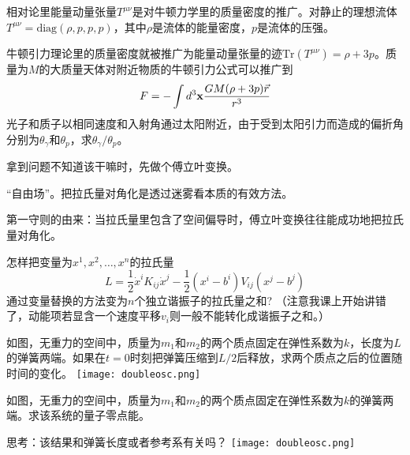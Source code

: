 \documentclass[CJK]{beamer}
\begin{document}
\begin{frame}
\bch
相对论里能量动量张量$T^{\mu\nu}$是对牛顿力学里的质量密度的推广。对静止的理想流体$T^{\mu\nu} = \mathrm{diag}(\rho, p, p, p)$，其中$\rho$是流体的能量密度，$p$是流体的压强。

牛顿引力理论里的质量密度就被推广为能量动量张量的迹$\mathrm{Tr}(T^{\mu\nu}) = \rho + 3p$。质量为$M$的大质量天体对附近物质的牛顿引力公式可以推广到
$$ F = - \int d^3{\mathbf{x}} \frac{GM(\rho + 3p) \vec{r}}{r^3}$$
光子和质子以相同速度和入射角通过太阳附近，由于受到太阳引力而造成的偏折角分别为$\theta_\gamma$和$\theta_p$，求$\theta_\gamma/\theta_p$。

\ech
\end{frame}

\begin{frame}
\bch
拿到问题不知道该干嘛时，先做个傅立叶变换。
\ech
\end{frame}

\begin{frame}
\bch

{“自由场”。把拉氏量对角化是透过迷雾看本质的有效方法。

\skipline
 第一守则的由来：当拉氏量里包含了空间偏导时，傅立叶变换往往能成功地把拉氏量对角化。}

\ech
\end{frame}

\begin{frame}
\bch
怎样把变量为$x^1, x^2,\ldots, x^n$的拉氏量
$$L = \frac{1}{2} \dot{x}^i K_{ij}\dot{x}^j - \frac{1}{2} (x^i-b^i) V_{ij} (x^j - b^j)$$
通过变量替换的方法变为$n$个独立谐振子的拉氏量之和? （注意我课上开始讲错了，动能项若显含一个速度平移$v_i$则一般不能转化成谐振子之和。）
\ech
\end{frame}


\begin{frame}
\bch
{}
如图，无重力的空间中，质量为$m_1$和$m_2$的两个质点固定在弹性系数为$k$，长度为$L$的弹簧两端。如果在$t=0$时刻把弹簧压缩到$L/2$后释放，求两个质点之后的位置随时间的变化。
\emini
{}
\texttt{[image: doubleosc.png]}
\emini
\ech
\end{frame}


\begin{frame}
\bch
{}
如图，无重力的空间中，质量为$m_1$和$m_2$的两个质点固定在弹性系数为$k$的弹簧两端。求该系统的量子零点能。

\skipline
思考：该结果和弹簧长度或者参考系有关吗？
\emini
{}
\texttt{[image: doubleosc.png]}
\emini
\ech
\end{frame}
\end{document}
